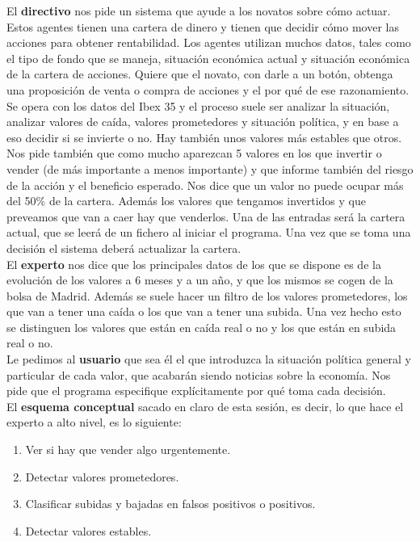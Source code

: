 \documentclass[12pt]{article}
\begin{document}
El \textbf{directivo} nos pide un sistema que ayude a los novatos sobre cómo actuar. Estos agentes tienen una cartera de dinero y tienen que decidir cómo mover las acciones para obtener rentabilidad. Los agentes utilizan muchos datos, tales como el tipo de fondo que se maneja, situación económica actual y situación económica de la cartera de acciones. Quiere que el novato, con darle a un botón, obtenga una proposición de venta o compra de acciones y el por qué de ese razonamiento. Se opera con los datos del Ibex 35 y el proceso suele ser analizar la situación, analizar valores de caída, valores prometedores y situación política, y en base a eso decidir si se invierte o no. Hay también unos valores más estables que otros. Nos pide también que como mucho aparezcan 5 valores en los que invertir o vender (de más importante a menos importante) y que informe también del riesgo de la acción y el beneficio esperado. Nos dice que un valor no puede ocupar más del 50\% de la cartera. Además los valores que tengamos invertidos y que preveamos que van a caer hay que venderlos. Una de las entradas será la cartera actual, que se leerá de un fichero al iniciar el programa. Una vez que se toma una decisión el sistema deberá actualizar la cartera.\\

El \textbf{experto} nos dice que los principales datos de los que se dispone es de la evolución de los valores a 6 meses y a un año, y que los mismos se cogen de la bolsa de Madrid. Además se suele hacer un filtro de los valores prometedores, los que van a tener una caída o los que van a tener una subida. Una vez hecho esto se distinguen los valores que están en caída real o no y los que están en subida real o no.\\

Le pedimos al \textbf{usuario} que sea él el que introduzca la situación política general y particular de cada valor, que acabarán siendo noticias sobre la economía. Nos pide que el programa especifique explícitamente por qué toma cada decisión.\\

El \textbf{esquema conceptual} sacado en claro de esta sesión, es decir, lo que hace el experto a alto nivel, es lo siguiente:
\begin{enumerate}
\item Ver si hay que vender algo urgentemente.
\item Detectar valores prometedores.
\item Clasificar subidas y bajadas en falsos positivos o positivos.
\item Detectar valores estables.
\end{enumerate}
\end{document}
